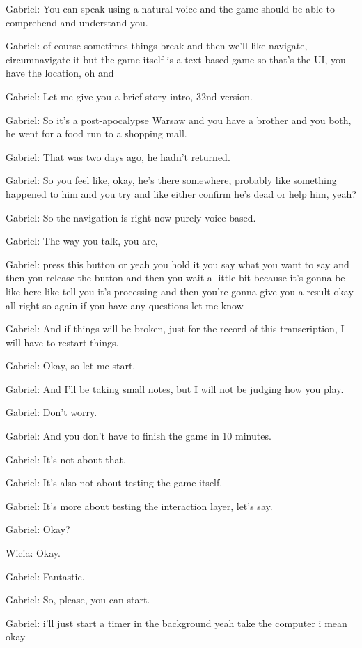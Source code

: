 Gabriel: You can speak using a natural voice and the game should be able to comprehend and understand you.

Gabriel: of course sometimes things break and then we'll like navigate, circumnavigate it but the game itself is a text-based game so that's the UI, you have the location, oh and

Gabriel: Let me give you a brief story intro, 32nd version.

Gabriel: So it's a post-apocalypse Warsaw and you have a brother and you both, he went for a food run to a shopping mall.

Gabriel: That was two days ago, he hadn't returned.

Gabriel: So you feel like, okay, he's there somewhere, probably like something happened to him and you try and like either confirm he's dead or help him, yeah?

Gabriel: So the navigation is right now purely voice-based.

Gabriel: The way you talk, you are,

Gabriel: press this button or yeah you hold it you say what you want to say and then you release the button and then you wait a little bit because it's gonna be like here like tell you it's processing and then you're gonna give you a result okay all right so again if you have any questions let me know

Gabriel: And if things will be broken, just for the record of this transcription, I will have to restart things.

Gabriel: Okay, so let me start.

Gabriel: And I'll be taking small notes, but I will not be judging how you play.

Gabriel: Don't worry.

Gabriel: And you don't have to finish the game in 10 minutes.

Gabriel: It's not about that.

Gabriel: It's also not about testing the game itself.

Gabriel: It's more about testing the interaction layer, let's say.

Gabriel: Okay?

Wicia: Okay.

Gabriel: Fantastic.

Gabriel: So, please, you can start.

Gabriel: i'll just start a timer in the background yeah take the computer i mean okay

